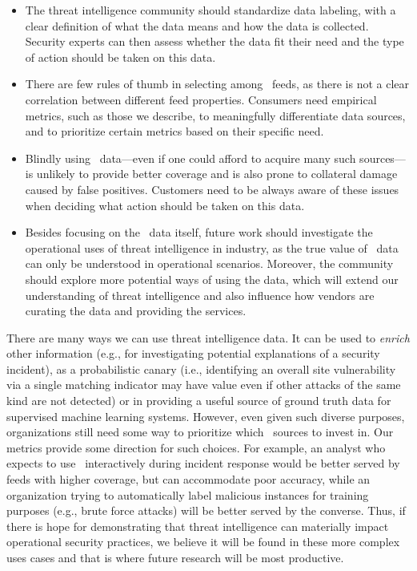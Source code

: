 \begin{itemize}
    \item The threat intelligence community should standardize data labeling,
    with a clear definition of what the data means and how the data is collected. Security experts can then assess
    whether the data fit their need and the type of action should be taken
    on this data.

    \item There are few rules of thumb in selecting among \ti\ feeds,
    as there is not a clear correlation between different feed properties.
    Consumers need empirical metrics, such as those we describe, to
    meaningfully differentiate data sources, and to prioritize certain metrics
    based on their specific need.

    \item Blindly using \ti\ data---even if one could afford to acquire
    many such sources---is unlikely to provide better coverage and is
    also prone to collateral damage caused by false positives. Customers
    need to be always aware of these issues when deciding what action
    should be taken on this data.

    \item Besides focusing on the \ti\ data itself, future work should investigate
    the operational uses of threat intelligence in industry, as
    the true value of \ti\ data can only be understood in operational scenarios.
    Moreover, the community should explore more potential ways of using the data,
    which will extend our understanding of threat intelligence and also influence
    how vendors are curating the data and providing the services.

\end{itemize}


There are many ways we can use threat intelligence data.
It can be used to \emph{enrich} other information
(e.g., for investigating potential explanations of a security
incident), as a probabilistic canary (i.e., identifying an overall
site vulnerability via a single matching indicator may have value even
if other attacks of the same kind are not detected) or in providing a
useful source of ground truth data for supervised machine learning
systems. However, even given
such diverse purposes, organizations still need some way to prioritize which
\ti\ sources to invest in.  Our metrics provide some direction for
such choices. For example, an analyst who expects to use \ti\ interactively
during incident response would be better served by feeds with higher coverage,
but can accommodate poor accuracy, while an organization trying to
automatically label malicious instances for training purposes (e.g.,
brute force attacks) will be better served by the converse.  Thus, if
there is hope for demonstrating that threat intelligence can
materially impact operational security practices, we believe it will
be found in these more complex uses cases and that is where future
research will be most productive.
